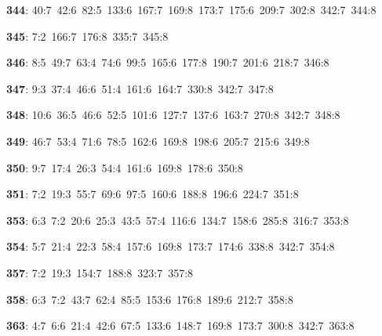 \noindent \textbf{344}: 40:7\allowbreak\ 42:6\allowbreak\ 82:5\allowbreak\ 133:6\allowbreak\ 167:7\allowbreak\ 169:8\allowbreak\ 173:7\allowbreak\ 175:6\allowbreak\ 209:7\allowbreak\ 302:8\allowbreak\ 342:7\allowbreak\ 344:8\par
\noindent \textbf{345}: 7:2\allowbreak\ 166:7\allowbreak\ 176:8\allowbreak\ 335:7\allowbreak\ 345:8\par
\noindent \textbf{346}: 8:5\allowbreak\ 49:7\allowbreak\ 63:4\allowbreak\ 74:6\allowbreak\ 99:5\allowbreak\ 165:6\allowbreak\ 177:8\allowbreak\ 190:7\allowbreak\ 201:6\allowbreak\ 218:7\allowbreak\ 346:8\par
\noindent \textbf{347}: 9:3\allowbreak\ 37:4\allowbreak\ 46:6\allowbreak\ 51:4\allowbreak\ 161:6\allowbreak\ 164:7\allowbreak\ 330:8\allowbreak\ 342:7\allowbreak\ 347:8\par
\noindent \textbf{348}: 10:6\allowbreak\ 36:5\allowbreak\ 46:6\allowbreak\ 52:5\allowbreak\ 101:6\allowbreak\ 127:7\allowbreak\ 137:6\allowbreak\ 163:7\allowbreak\ 270:8\allowbreak\ 342:7\allowbreak\ 348:8\par
\noindent \textbf{349}: 46:7\allowbreak\ 53:4\allowbreak\ 71:6\allowbreak\ 78:5\allowbreak\ 162:6\allowbreak\ 169:8\allowbreak\ 198:6\allowbreak\ 205:7\allowbreak\ 215:6\allowbreak\ 349:8\par
\noindent \textbf{350}: 9:7\allowbreak\ 17:4\allowbreak\ 26:3\allowbreak\ 54:4\allowbreak\ 161:6\allowbreak\ 169:8\allowbreak\ 178:6\allowbreak\ 350:8\par
\noindent \textbf{351}: 7:2\allowbreak\ 19:3\allowbreak\ 55:7\allowbreak\ 69:6\allowbreak\ 97:5\allowbreak\ 160:6\allowbreak\ 188:8\allowbreak\ 196:6\allowbreak\ 224:7\allowbreak\ 351:8\par
\noindent \textbf{353}: 6:3\allowbreak\ 7:2\allowbreak\ 20:6\allowbreak\ 25:3\allowbreak\ 43:5\allowbreak\ 57:4\allowbreak\ 116:6\allowbreak\ 134:7\allowbreak\ 158:6\allowbreak\ 285:8\allowbreak\ 316:7\allowbreak\ 353:8\par
\noindent \textbf{354}: 5:7\allowbreak\ 21:4\allowbreak\ 22:3\allowbreak\ 58:4\allowbreak\ 157:6\allowbreak\ 169:8\allowbreak\ 173:7\allowbreak\ 174:6\allowbreak\ 338:8\allowbreak\ 342:7\allowbreak\ 354:8\par
\noindent \textbf{357}: 7:2\allowbreak\ 19:3\allowbreak\ 154:7\allowbreak\ 188:8\allowbreak\ 323:7\allowbreak\ 357:8\par
\noindent \textbf{358}: 6:3\allowbreak\ 7:2\allowbreak\ 43:7\allowbreak\ 62:4\allowbreak\ 85:5\allowbreak\ 153:6\allowbreak\ 176:8\allowbreak\ 189:6\allowbreak\ 212:7\allowbreak\ 358:8\par
\noindent \textbf{363}: 4:7\allowbreak\ 6:6\allowbreak\ 21:4\allowbreak\ 42:6\allowbreak\ 67:5\allowbreak\ 133:6\allowbreak\ 148:7\allowbreak\ 169:8\allowbreak\ 173:7\allowbreak\ 300:8\allowbreak\ 342:7\allowbreak\ 363:8\par
